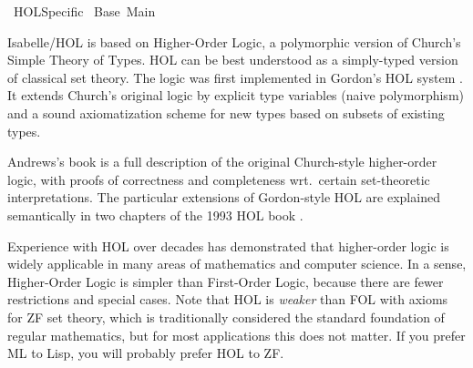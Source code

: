 %
\begin{isabellebody}%
\def\isabellecontext{HOL{\isaliteral{5F}{\isacharunderscore}}Specific}%
%
\isadelimtheory
%
\endisadelimtheory
%
\isatagtheory
{}\isamarkupfalse%
\ HOL{}Specific\isanewline
{}\ Base\ Main\isanewline
{}%
\endisatagtheory
{\isafoldtheory}%
%
\isadelimtheory
%
\endisadelimtheory
%
\isamarkuptrue%
%
\isamarkuptrue%
%
\begin{isamarkuptext}%
Isabelle/HOL is based on Higher-Order Logic, a polymorphic
  version of Church's Simple Theory of Types.  HOL can be best
  understood as a simply-typed version of classical set theory.  The
  logic was first implemented in Gordon's HOL system
  \cite{mgordon-hol}.  It extends Church's original logic
  \cite{church40} by explicit type variables (naive polymorphism) and
  a sound axiomatization scheme for new types based on subsets of
  existing types.

  Andrews's book \cite{andrews86} is a full description of the
  original Church-style higher-order logic, with proofs of correctness
  and completeness wrt.\ certain set-theoretic interpretations.  The
  particular extensions of Gordon-style HOL are explained semantically
  in two chapters of the 1993 HOL book \cite{pitts93}.

  Experience with HOL over decades has demonstrated that higher-order
  logic is widely applicable in many areas of mathematics and computer
  science.  In a sense, Higher-Order Logic is simpler than First-Order
  Logic, because there are fewer restrictions and special cases.  Note
  that HOL is \emph{weaker} than FOL with axioms for ZF set theory,
  which is traditionally considered the standard foundation of regular
  mathematics, but for most applications this does not matter.  If you
  prefer ML to Lisp, you will probably prefer HOL to ZF.


\end{isamarkuptext}
\end{isabellebody}
